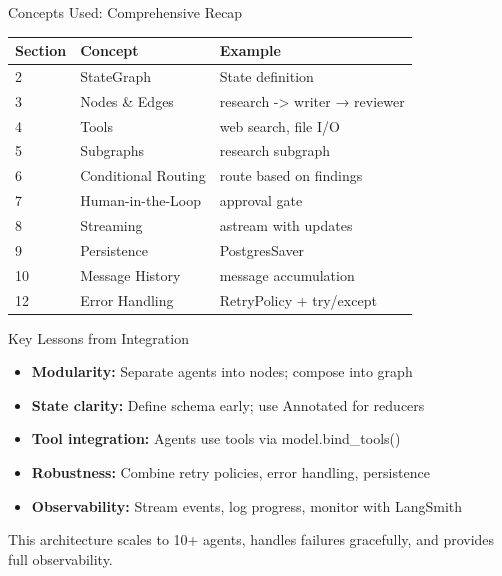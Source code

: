 \documentclass[aspectratio=169,11pt]{beamer}
\begin{document}
\begin{frame}{Concepts Used: Comprehensive Recap}
\small
\begin{tabular}{lll}
\toprule
\textbf{Section} & \textbf{Concept} & \textbf{Example} \\
\midrule
2 & StateGraph & State definition \\
3 & Nodes \& Edges & research -> writer → reviewer \\
4 & Tools & web search, file I/O \\
5 & Subgraphs & research subgraph \\
6 & Conditional Routing & route based on findings \\
7 & Human-in-the-Loop & approval gate \\
8 & Streaming & astream with updates \\
9 & Persistence & PostgresSaver \\
10 & Message History & message accumulation \\
12 & Error Handling & RetryPolicy + try/except \\
\bottomrule
\end{tabular}
\end{frame}

\begin{frame}{Key Lessons from Integration}
\setlength{\itemsep}{1pt}
\begin{itemize}
\item \textbf{Modularity:} Separate agents into nodes; compose into graph
\item \textbf{State clarity:} Define schema early; use Annotated for reducers
\item \textbf{Tool integration:} Agents use tools via model.bind\_tools()
\item \textbf{Robustness:} Combine retry policies, error handling, persistence
\item \textbf{Observability:} Stream events, log progress, monitor with LangSmith
\end{itemize}
\vspace{0.15cm}
\begin{tipbox}
This architecture scales to 10+ agents, handles failures gracefully, and provides full observability.
\end{tipbox}
\end{frame}
\end{document}
